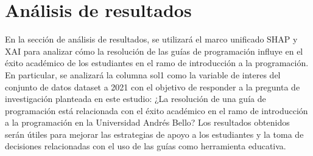 \hypertarget{analisis_resultado}{%
    \section{Análisis de resultados}\label{Análisis de resultados}}

En la sección de análisis de resultados, se utilizará el marco unificado SHAP y XAI para analizar cómo la resolución de las guías de programación influye en el éxito académico de los estudiantes en el ramo de introducción a la programación. En particular, se analizará la columna sol1 como la variable de interes del conjunto de datos dataset a 2021 con el objetivo de responder a la pregunta de investigación planteada en este estudio: ¿La resolución de una guía de programación está relacionada con el éxito académico en el ramo de introducción a la programación en la Universidad Andrés Bello? Los resultados obtenidos serán útiles para mejorar las estrategias de apoyo a los estudiantes y la toma de decisiones relacionadas con el uso de las guías como herramienta educativa.







